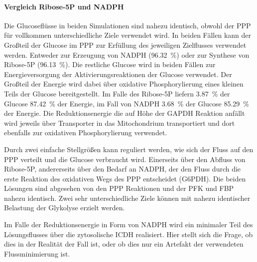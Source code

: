 \paragraph{Vergleich Ribose-5P und NADPH}
Die Glucoseflüsse in beiden Simulationen sind nahezu identisch, obwohl der PPP für vollkommen unterschiedliche Ziele verwendet wird. In beiden Fällen kann der Großteil der Glucose im PPP zur Erfüllung des jeweiligen Zielflusses verwendet werden. Entweder zur Erzeugung von NADPH (96.32~\%) oder zur Synthese von Ribose-5P (96.13~\%).
Die restliche Glucose wird in beiden Fällen zur Energieversorgung der Aktivierungsreaktionen der Glucose verwendet. Der Großteil der Energie wird dabei über oxidative Phosphorylierung eines kleinen Teils der Glucose bereitgestellt. Im Falle des Ribose-5P liefern 3.87~\% der Glucose 87.42~\% der Energie, im Fall von NADPH 3.68~\% der Glucose 85.29~\% der Energie. Die Reduktionsenergie die auf Höhe der GAPDH Reaktion anfällt wird jeweils über Transporter in das Mitochondrium transportiert und dort ebenfalls zur oxidativen Phosphorylierung verwendet.

Durch zwei einfache Stellgrößen kann reguliert werden, wie sich der Fluss auf den PPP verteilt und die Glucose verbraucht wird. Einerseits über den Abfluss von Ribose-5P, andererseits über den Bedarf an NADPH, der den Fluss durch die erste Reaktion des oxidativen Wegs des PPP entscheidet (G6PDH). Die beiden Lösungen sind abgesehen von den PPP Reaktionen und der PFK und FBP nahezu identisch. Zwei sehr unterschiedliche Ziele können mit nahezu identischer Belastung der Glykolyse erzielt werden.

Im Falle der Reduktionsenergie in Form von NADPH wird ein minimaler Teil des Lösungsflusses über die zytosolische ICDH realisiert. Hier stellt sich die Frage, ob dies in der Realität der Fall ist, oder ob dies nur ein Artefakt der verwendeten Flussminimierung ist. 


\clearpage
\begin{comment}
Die Gluconeogenese ausgehend von Laktat ist von zentraler Bedeutung bei Muskelarbeit. Laktat entsteht v.a. wenn Glykolyse unter anaeroben Bedingungen stattfindet (siehe auch Simulationen zur anaeroben Glykolyse). Das bei Muskeltätigkeit entstehende Pyruvat wird, falls dieses nicht für die oxidative Phosphorylierung verwendet werden kann, zu Laktat umgewandelt und an den Blutkreislauf abgegeben. Die Leber wandelt dieses auf dem Weg der Gluconeogenese wieder in Glucose zurück. Dieses steht nach Abgabe an den Blutkreislauf wieder für den Muskel zur Verfügung (Cori-Zyklus) \cite{Nelson2008}.

Die Gluconeogenese ausgehend von Alanin ist wichtig für Ammoniakentgiftung. Ammoniak kann in extrahepatischen Geweben mittels ALT auf Pyruvat übertragen und anschließend als Alanin über das Blut zur Leber transportiert werden. Im Hepatozyten kann das Alanin zur Gluconeogenese verwendet werden, das dabei entstehende Ammoniak wird entgiftet (Glucose-Alanin Zyklus)
This also is the case for alanine, another major product of glycolysis. It is used to transfer amino groups back to the liver from other organs. \cite{Felig1975}

 \cite{Nelson2008}.
\end{comment}

